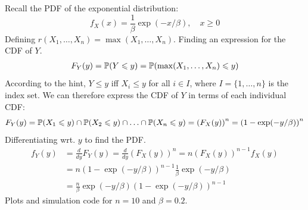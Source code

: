 \medskip\noindent
Recall the PDF of the exponential distribution:
$$
f_X(x) = \frac{1}{\beta}\exp\left(-x/\beta\right), \quad x\geq 0
$$
Defining $r(X_1,\ldots, X_n) = \max(X_1,\ldots, X_n)$. Finding an expression for the CDF of $Y$.
\begin{align*}
    F_Y(y) = \P(Y\leq y) = \P(\max(X_1,\ldots, X_n)\leq y)
\end{align*}
According to the hint, $Y\leq y$ iff $X_i\leq y$ for all $i\in I$, where $I=\{1,\ldots, n\}$
is the index set. We can therefore express the CDF of $Y$ in terms of each individual CDF:
$$
F_Y(y) = \P(X_1\leq y)\cap \P(X_2\leq y)\cap\ldots\cap\P(X_n\leq y) = \left(F_X(y)\right)^n
= \left(1 - \exp(-y/\beta)\right)^n
$$
Differentiating wrt. $y$ to find the PDF.
\begin{align*}
    f_Y(y) &= 
    \frac{d}{dy}F_Y(y) =
    \frac{d}{dy}(F_X(y))^n
    = n(F_X(y))^{n-1}f_X(y)\\
    &= n\left(1 - \exp(-y/\beta)\right)^{n-1}\frac{1}{\beta}\exp\left(-y/\beta\right) \\
    &= \frac{n}{\beta}\exp\left(-y/\beta\right)\left(1 - \exp(-y/\beta)\right)^{n-1}
\end{align*}
Plots and simulation code for $n=10$ and $\beta = 0.2$.
